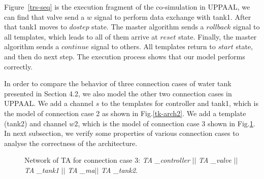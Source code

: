 Figure~\ref{trs-seq} is the execution fragment of the co-simulation in UPPAAL, we can find that valve send a $w$ signal to perform data exchange with tank1. After that tank1 moves to $dostep$ state. The master algorithm sends a $rollback$ signal to all templates, which leads to all of them arrive at $reset$ state. Finally, the master algorithm sends a $continue$ signal to others. All templates return to $start$ state, and then do next step. The execution process shows that our model performs correctly.

In order to compare the behavior of three connection cases of water tank presented in Section 4.2, we also model the other two connection cases in UPPAAL. We add a channel $s$ to the templates for controller and tank1, which is the model of connection case 2 as shown in Fig.\ref{tk-arch2}. We add a template (tank2) and channel $w2$, which is the model of connection case 3 shown in Fig.\ref{arc3}. In next subsection, we verify some properties of various connection cases to analyse the correctness of the architecture.
\begin{figure}[htbp]
\end{figure}
\begin{figure}[htbp]
	\caption{Network of TA for connection case 3: \emph{TA \_{controller}} $\vert\vert$ \emph{TA \_{valve}} $\vert\vert$ \emph{TA \_{tank1}} $\vert\vert$ \emph{TA \_{ma}}$\vert\vert$ \emph{TA \_{tank2}}.}\label{arc3}
\end{figure}

